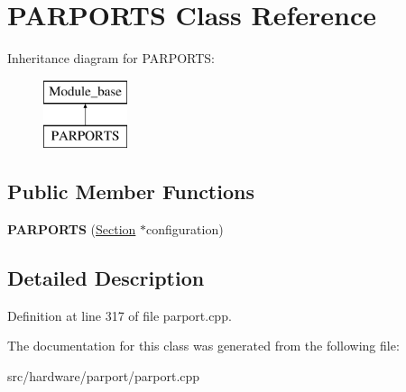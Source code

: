 \hypertarget{classPARPORTS}{\section{P\-A\-R\-P\-O\-R\-T\-S Class Reference}
\label{classPARPORTS}
}
Inheritance diagram for P\-A\-R\-P\-O\-R\-T\-S\-:\begin{figure}[H]
\begin{center}
\leavevmode
\includegraphics[height=2.000000cm]{classPARPORTS}
\end{center}
\end{figure}
\subsection*{Public Member Functions}
\begin{DoxyCompactItemize}
\item 
\hypertarget{classPARPORTS_ae31b01031b124375887e40c08d13351e}{{\bfseries P\-A\-R\-P\-O\-R\-T\-S} (\hyperlink{classSection}{Section} $\ast$configuration)}\label{classPARPORTS_ae31b01031b124375887e40c08d13351e}

\end{DoxyCompactItemize}


\subsection{Detailed Description}


Definition at line 317 of file parport.\-cpp.



The documentation for this class was generated from the following file\-:\begin{DoxyCompactItemize}
\item 
src/hardware/parport/parport.\-cpp\end{DoxyCompactItemize}

